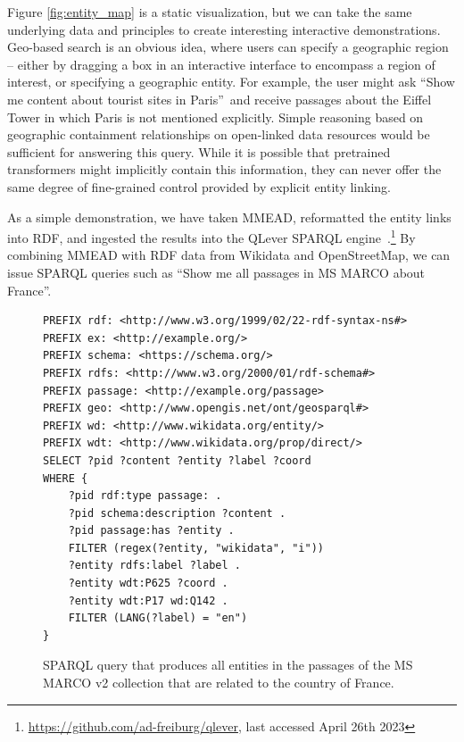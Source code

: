 Figure \ref{fig:entity_map} is a static visualization, but we can take the same underlying data and principles to create interesting interactive demonstrations.
Geo-based search is an obvious idea, where users can specify a geographic region -- either by dragging a box in an interactive interface to encompass a region of interest, or specifying a geographic entity.
For example, the user might ask ``Show me content about tourist sites in Paris''\ and receive passages about the Eiffel Tower in which Paris is not mentioned explicitly.
Simple reasoning based on geographic containment relationships on open-linked data resources would be sufficient for answering this query.
While it is possible that pretrained transformers might implicitly contain this information, they can never offer the same degree of fine-grained control provided by explicit entity linking.

As a simple demonstration, we have taken MMEAD, reformatted the entity links into RDF, and ingested the results into the QLever SPARQL engine~\citep{qlever}.\footnote{\url{https://github.com/ad-freiburg/qlever}, last accessed April 26th 2023}
By combining MMEAD with RDF data from Wikidata and OpenStreetMap, we can issue SPARQL queries such as ``Show me all passages in MS MARCO about France''.

\begin{figure}
	\centering
	\begin{verbatim}
PREFIX rdf: <http://www.w3.org/1999/02/22-rdf-syntax-ns#>
PREFIX ex: <http://example.org/> 
PREFIX schema: <https://schema.org/>
PREFIX rdfs: <http://www.w3.org/2000/01/rdf-schema#>
PREFIX passage: <http://example.org/passage> 
PREFIX geo: <http://www.opengis.net/ont/geosparql#>
PREFIX wd: <http://www.wikidata.org/entity/>
PREFIX wdt: <http://www.wikidata.org/prop/direct/>
SELECT ?pid ?content ?entity ?label ?coord 
WHERE {
	?pid rdf:type passage: .
	?pid schema:description ?content .
	?pid passage:has ?entity .
	FILTER (regex(?entity, "wikidata", "i"))
	?entity rdfs:label ?label .
	?entity wdt:P625 ?coord .
	?entity wdt:P17 wd:Q142 .
	FILTER (LANG(?label) = "en")
}
	\end{verbatim}
	\caption{SPARQL query that produces all entities in the passages of the MS MARCO v2 collection that are related to the country of France.}
	\label{fig:code_sparql}
\end{figure}

